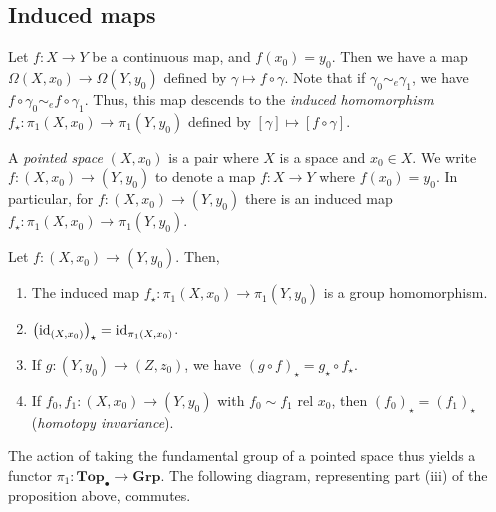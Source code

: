 \subsection{Induced maps}
\begin{definition}
	Let \( f \colon X \to Y \) be a continuous map, and \( f(x_0) = y_0 \).
	Then we have a map \( \Omega(X,x_0) \to \Omega(Y,y_0) \) defined by \( \gamma \mapsto f \circ \gamma \).
	Note that if \( \gamma_0 \sim_e \gamma_1 \), we have \( f \circ \gamma_0 \sim_e f \circ \gamma_1 \).
	Thus, this map descends to the \emph{induced homomorphism} \( f_\star \colon \pi_1(X, x_0) \to \pi_1(Y,y_0) \) defined by \( [\gamma] \mapsto [f \circ \gamma] \).
\end{definition}
\begin{definition}
	A \emph{pointed space} \( (X, x_0) \) is a pair where \( X \) is a space and \( x_0 \in X \).
	We write \( f \colon (X, x_0) \to (Y, y_0) \) to denote a map \( f \colon X \to Y \) where \( f(x_0) = y_0 \).
	In particular, for \( f \colon (X,x_0) \to (Y,y_0) \) there is an induced map \( f_\star \colon \pi_1(X,x_0) \to \pi_1(Y,y_0) \).
\end{definition}
\begin{proposition}
	Let \( f \colon (X, x_0) \to (Y, y_0) \).
	Then,
	\begin{enumerate}
		\item The induced map \( f_\star \colon \pi_1(X, x_0) \to \pi_1(Y, y_0) \) is a group homomorphism.
		\item \( \qty(\mathrm{id}_{(X, x_0)})_\star = \mathrm{id}_{\pi_1(X,x_0)} \).
		\item If \( g \colon (Y, y_0) \to (Z, z_0) \), we have \( (g \circ f)_\star = g_\star \circ f_\star \).
		\item If \( f_0, f_1 \colon (X, x_0) \to (Y, y_0) \) with \( f_0 \sim f_1 \text{ rel } x_0 \), then \( (f_0)_\star = (f_1)_\star \) (\emph{homotopy invariance}).
	\end{enumerate}
\end{proposition}
\begin{remark}
	The action of taking the fundamental group of a pointed space thus yields a functor \( \pi_1 \colon \mathbf{Top}_\bullet \to \mathbf{Grp} \).
	The following diagram, representing part (iii) of the proposition above, commutes.
	\begin{center}
	\end{center}
\end{remark}
